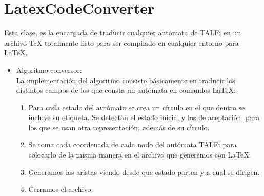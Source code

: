 \documentclass[12pt,a4paper,spanish]{book}
\begin{document}
\section{LatexCodeConverter\\}
Esta clase, es la encargada de traducir cualquier aut\'omata de TALFi en un archivo \TeX{} totalmente listo para ser compilado en cualquier entorno para \LaTeX{}.
\newline
\begin{itemize}
\item Algoritmo conversor:\\
\newline
La implementaci\'on del algoritmo consiste b\'asicamente en traducir los distintos campos de los que consta un aut\'omata en comandos \LaTeX{}:
\begin{enumerate}
\item Para cada estado del aut\'omata se crea un c\'irculo en el que dentro se incluye su etiqueta. Se detectan el estado inicial y los de aceptaci\'on, para los que se usan otra representaci\'on, adem\'as de su c\'irculo.
\item Se toma cada coordenada de cada nodo del aut\'omata TALFi para colocarlo de la misma manera en el archivo que generemos con \LaTeX{}.
\item Generamos las aristas viendo desde que estado parten y a cual se dirigen.
\item Cerramos el archivo.\\
\end{enumerate}


\end{itemize}
\end{document}
